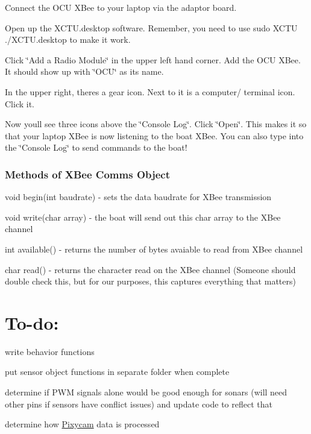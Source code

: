 \begin{DoxyEnumerate}
\item Connect the O\+CU X\+Bee to your laptop via the adaptor board.
\item Open up the X\+C\+T\+U.\+desktop software. Remember, you need to use {\ttfamily sudo X\+C\+TU ./\+X\+C\+TU.desktop} to make it work.
\item Click \char`\"{}\+Add a Radio Module\char`\"{} in the upper left hand corner. Add the O\+CU X\+Bee. It should show up with \char`\"{}\+O\+C\+U\char`\"{} as its name.
\item In the upper right, there\textquotesingle{}s a gear icon. Next to it is a computer/ terminal icon. Click it.
\item Now you\textquotesingle{}ll see three icons above the \char`\"{}\+Console Log\char`\"{}. Click \char`\"{}\+Open\char`\"{}. This makes it so that your laptop X\+Bee is now listening to the boat X\+Bee. You can also type into the \char`\"{}\+Console Log\char`\"{} to send commands to the boat!
\end{DoxyEnumerate}

\subsubsection*{Methods of X\+Bee Comms Object}


\begin{DoxyItemize}
\item {\ttfamily void begin(int baudrate)} -\/ sets the data baudrate for X\+Bee transmission
\item {\ttfamily void write(char array)} -\/ the boat will send out this char array to the X\+Bee channel
\item {\ttfamily int available()} -\/ returns the number of bytes avaiable to read from X\+Bee channel
\item {\ttfamily char read()} -\/ returns the character read on the X\+Bee channel (Someone should double check this, but for our purposes, this captures everything that matters)
\end{DoxyItemize}

\section*{To-\/do\+:}


\begin{DoxyItemize}
\item write behavior functions
\item put sensor object functions in separate folder when complete
\item determine if P\+WM signals alone would be good enough for sonars (will need other pins if sensors have conflict issues) and update code to reflect that
\item determine how \hyperlink{class_pixycam}{Pixycam} data is processed 
\end{DoxyItemize}
